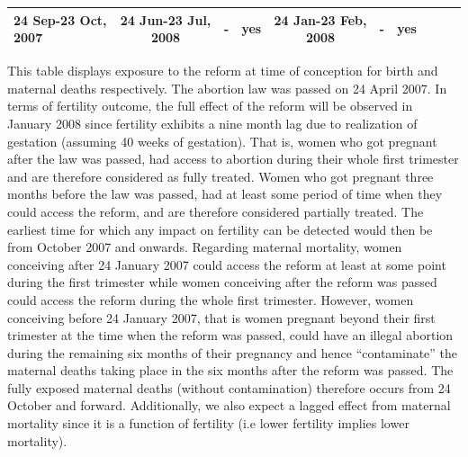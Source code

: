 \documentclass[a4paper, 11pt]{article}
\begin{document}
\begin{spacing}{1.4}
\begin{table}
\begin{threeparttable}
{\begin{tabular}{lccccccccc}
        24 Sep-23 Oct, 2007	&	24 Jun-23 Jul, 2008	&	-	&	yes	&	24 Jan-23 Feb, 2008	&	-	&	yes	\\
        \hline 	\hline 
    \end{tabular} }
    \begin{tablenotes}
      \small This table displays exposure to the reform at time of conception for birth and maternal deaths respectively. The abortion law was passed on 24 April 2007. In terms of fertility outcome, the full effect of the reform will be observed in January 2008 since fertility exhibits a nine month lag due to realization of gestation (assuming 40 weeks of gestation). That is, women who got pregnant after the law was passed, had access to abortion during their whole first trimester and are therefore considered as fully treated. Women who got pregnant three months before the law was passed, had at least some period of time when they could access the reform, and are therefore considered partially treated. The earliest time for which any impact on fertility can be detected would then be from October 2007 and onwards. Regarding maternal mortality, women conceiving after 24 January 2007 could access the reform at least at some point during the first trimester while women conceiving after the reform was passed could access the reform during the whole first trimester. However, women conceiving before 24 January 2007, that is women pregnant beyond their first trimester at the time when the reform was passed, could have an illegal abortion during the remaining six months of their pregnancy and hence ``contaminate'' the maternal deaths taking place in the six months after the reform was passed. The fully exposed maternal deaths (without contamination) therefore occurs from 24 October and forward. Additionally, we also expect a lagged effect from maternal mortality since it is a function of fertility (i.e lower fertility implies lower mortality).  
    \end{tablenotes}
  \end{threeparttable} 	
\end{table}  


\end{spacing}
\end{document}
